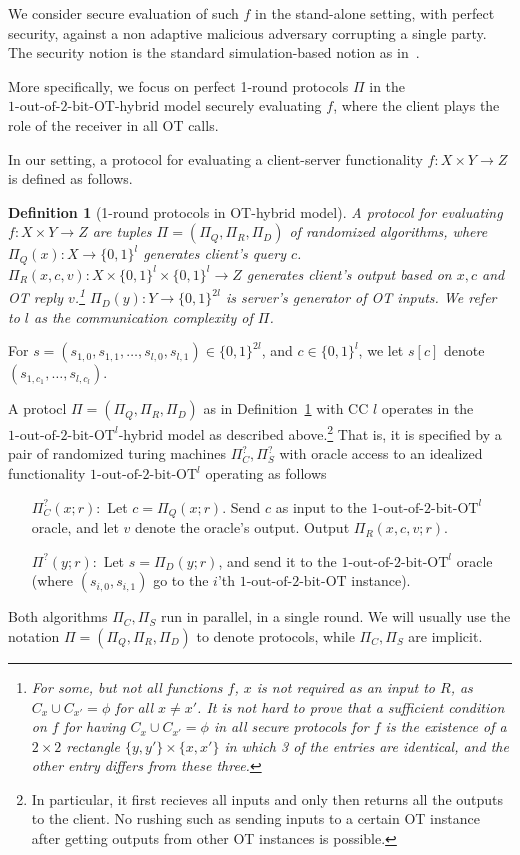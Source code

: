 \documentclass[a4paper]{article}
\newtheorem{definition}{Definition}[section]
\newcommand{\OT}[2]{#1\text{-out-of-}#2\text{-bit-OT}}
\begin{document}
We consider secure evaluation of such $f$ in the stand-alone setting, with perfect security, against a non adaptive malicious adversary corrupting a single party. The security notion is the standard simulation-based notion as in~\cite{Gol}.

More specifically, we focus 
on perfect 1-round protocols $\Pi$ in the $\OT{1}{2}$-hybrid model
securely evaluating $f$, where the client plays the role of the receiver in all OT calls. 


In our setting, a protocol for evaluating a client-server functionality
$f:X\times Y\rightarrow Z$ is defined as follows.

\begin{definition}[1-round protocols in OT-hybrid model]\label{def-prot}
	A protocol for evaluating $f:X\times Y\rightarrow Z$ are tuples $\Pi=(\Pi_Q,\Pi_R,\Pi_D)$ of randomized algorithms, where $\Pi_Q(x):X\rightarrow \{0,1\}^l$ generates client's query $c$. $\Pi_R(x,c,v):X\times\{0,1\}^l\times  \{0,1\}^l\rightarrow Z$ generates client's output based on $x,c$ and OT reply $v$.\footnote{For some, but not all functions $f$, $x$ is not required as an input to $R$, as $C_x\cup C_{x'}=\phi$ for all $x\neq x'$. It is not hard to prove that a sufficient condition on $f$ for having $C_x\cup C_{x'}=\phi$ in all secure protocols for $f$ is the existence of a $2\times 2$ rectangle $\{y,y'\}\times\{x,x'\}$ in which 3 of the entries are identical, and the other entry differs from these three.} $\Pi_D(y):Y\rightarrow \{0,1\}^{2l}$ is server's generator of OT inputs. We refer to $l$ as the communication complexity of $\Pi$.
\end{definition}

For $s=(s_{1,0},s_{1,1},\ldots,s_{l,0},s_{l,1})\in\{0,1\}^{2l}$,
and $c\in\{0,1\}^l$, we let $s[c]$ denote $(s_{1,c_1},\ldots,s_{l,c_l})$.

A protocl $\Pi=(\Pi_Q,\Pi_R,\Pi_D)$ as in Definition~\ref{def-prot} with CC $l$ operates in the ${\OT{1}{2}}^l$-hybrid model as described above.\footnote{In particular, it first recieves all inputs and only then returns all the outputs to the client. No rushing such as sending inputs to a certain OT instance after getting outputs from other OT instances is possible.}
That is, it is specified by a pair of randomized turing machines $\Pi^?_C,\Pi^?_S$ with oracle access to an idealized functionality ${\OT{1}{2}}^l$ operating as follows
\begin{enumerate}
	\item[$\Pi^?_C(x;r):$] 
	Let $c=\Pi_Q(x;r)$. Send $c$ as input to the ${\OT{1}{2}}^l$ oracle, and let $v$ denote the oracle's output. Output $\Pi_R(x,c,v;r)$.
	\item[$\Pi^?(y;r):$] Let $s=\Pi_D(y;r)$, and send it to the 
	${\OT{1}{2}}^l$ oracle (where $(s_{i,0},s_{i,1})$ go to the $i$'th $\OT{1}{2}$ instance).  
\end{enumerate}
Both algorithms $\Pi_C,\Pi_S$ run in parallel, in a single round.
We will usually use the notation $\Pi=(\Pi_Q,\Pi_R,\Pi_D)$ to denote protocols, while $\Pi_C,\Pi_S$ are implicit.
\end{document}
